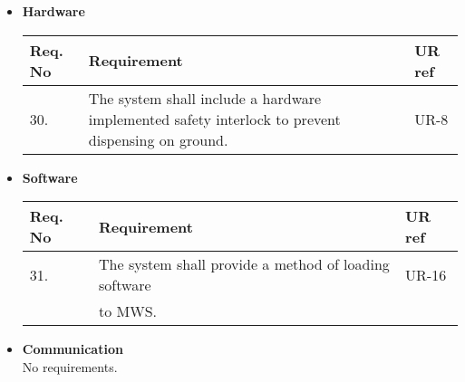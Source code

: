\begin{itemize}
\item \textbf{Hardware}
 	\begin{center}
   	\begin{tabular}{ | l | p{9cm} | l |}
    \hline
    Req. No & Requirement  & UR ref \\ \hline
    30. &The system shall include a hardware implemented safety interlock to prevent dispensing on ground. &UR-8\\
    \hline
    \end{tabular}
	\end{center}
\item \textbf{Software}
 	\begin{center}
   	\begin{tabular}{ | l | p{9cm} | l |}
    \hline
    Req. No & Requirement  & UR ref \\ \hline
    31. &The system shall provide a method of loading software&UR-16\\ &to MWS. &\\
    \hline
    \end{tabular}
	\end{center}
\item \textbf{Communication}\\
No requirements.
\end{itemize}
    